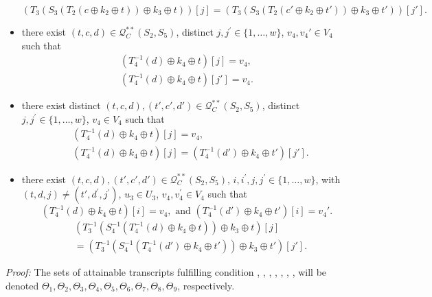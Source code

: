 \begin{itemize}
$$
  \left(T_{3}\left(S_{3}\left(T_2\left(c \oplus k_{2} \oplus t\right)\right) \oplus k_{3} \oplus t\right)\right)[j] = \left(T_{3}\left(S_{3}\left(T_2\left(c' \oplus k_{2} \oplus t'\right)\right) \oplus k_{3} \oplus t'\right)\right)[j'].
$$
  \item[\hseven]
  there exist $(t, c, d) \in \mathcal{Q}_{C}^{**}\left(S_{2}, S_{5}\right)$, distinct $j, j^{\prime}\in\{1, \ldots, w\}$, $v_{4},v_{4}' \in V_{4}$ such that
  $$
  \begin{aligned}  
 \left(T_{4}^{-1}\left(d \right) \oplus k_{4} \oplus t\right)[j] = v_4, \\
  \left(T_{4}^{-1}\left(d \right) \oplus k_{4} \oplus t\right)[j'] = v_4.
  \end{aligned}
  $$
  \item[\height]
  there exist distinct $(t, c, d),(t', c', d') \in \mathcal{Q}_{C}^{**}\left(S_{2}, S_{5}\right)$, distinct $j, j^{\prime}\in\{1, \ldots, w\}$, $v_{4} \in V_{4}$ such that
  $$
  \begin{aligned}
  &\left(T_{4}^{-1}\left(d \right) \oplus k_{4} \oplus t\right)[j] = v_4, \\
  &\left(T_{4}^{-1}\left(d \right) \oplus k_{4} \oplus t\right)[j] = \left(T_{4}^{-1}\left(d' \right) \oplus k_{4} \oplus t'\right)[j'].
  \end{aligned}
  $$
  \item[\hnine]
  there exist $(t, c, d), (t', c', d') \in \mathcal{Q}_{C}^{**}\left(S_{2}, S_{5}\right)$, $i, i^{\prime}, j, j^{\prime} \in\{1, \ldots, w\}$, with$(t, d, j) \neq \left(t', d^{\prime}, j^{\prime}\right)$, $u_{3} \in U_{3}$, $v_{4},v_{4}^{\prime} \in V_{4}$ such that 
  $$
 \left(T_{4}^{-1}\left(d \right) \oplus k_{4} \oplus t\right)[i] = v_4, \text{ and }
  \left(T_{4}^{-1}\left(d' \right) \oplus k_{4} \oplus t'\right)[i] = v_4'. $$ 
  $$
\begin{aligned}
  &\left(T_{3}^{-1}\left(S_{4}^{-1}\left(T_{4}^{-1}\left(d\right) \oplus k_{4} \oplus t\right)\right) \oplus k_{3} \oplus t\right)[j] \\
  &=  \left(T_{3}^{-1}\left(S_{4}^{-1}\left(T_{4}^{-1}\left(d'\right) \oplus k_{4} \oplus t'\right)\right) \oplus k_{3} \oplus t'\right)[j'].
\end{aligned}
$$
\end{itemize}

\noindent \emph{Proof:} The sets of attainable transcripts fulfilling condition \hone, \htwo, \hthree, \hfour, \hfive, \hsix, \hseven \height, \hnine will be denoted $\Theta_{1}, \Theta_{2}, \Theta_{3}, \Theta_{4}, \Theta_{5}, \Theta_{6}, \Theta_{7}, \Theta_{8}, \Theta_{9}$, respectively.\\

